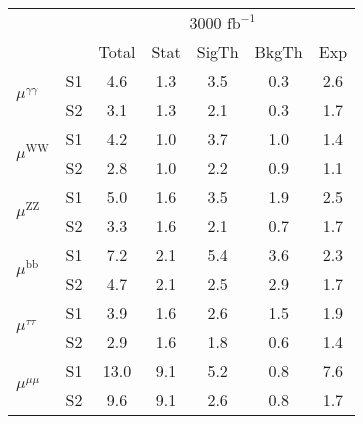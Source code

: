 \begin{tabular}{@{} l c c@{\hskip 0.15in} c c c c @{}}
 \hline
  &  & \multicolumn{5}{c}{3000 $\text{fb}^{-1}$} \\
  &  & Total & Stat & SigTh & BkgTh & Exp \\
 \hline
\multirow{2}{*}{$\mu^{\gamma \gamma }$} & S1  & 4.6& 1.3 & 3.5 & 0.3 & 2.6  \\[1pt]
                        & S2  & 3.1& 1.3 & 2.1 & 0.3 & 1.7  \\[4pt]
\multirow{2}{*}{$\mu^{\mathrm{WW}}$} & S1  & 4.2& 1.0 & 3.7 & 1.0 & 1.4  \\[1pt]
                        & S2  & 2.8& 1.0 & 2.2 & 0.9 & 1.1  \\[4pt]
\multirow{2}{*}{$\mu^{\mathrm{ZZ}}$} & S1  & 5.0& 1.6 & 3.5 & 1.9 & 2.5  \\[1pt]
                        & S2  & 3.3& 1.6 & 2.1 & 0.7 & 1.7  \\[4pt]
\multirow{2}{*}{$\mu^{\mathrm{bb}}$} & S1  & 7.2& 2.1 & 5.4 & 3.6 & 2.3  \\[1pt]
                        & S2  & 4.7& 2.1 & 2.5 & 2.9 & 1.7  \\[4pt]
\multirow{2}{*}{$\mu^{\tau \tau }$} & S1  & 3.9& 1.6 & 2.6 & 1.5 & 1.9  \\[1pt]
                        & S2  & 2.9& 1.6 & 1.8 & 0.6 & 1.4  \\[4pt]
\multirow{2}{*}{$\mu^{\mu\mu}$} & S1  & 13.0& 9.1 & 5.2 & 0.8 & 7.6  \\[1pt]
                        & S2  & 9.6& 9.1 & 2.6 & 0.8 & 1.7  \\[4pt]
\hline
\end{tabular}